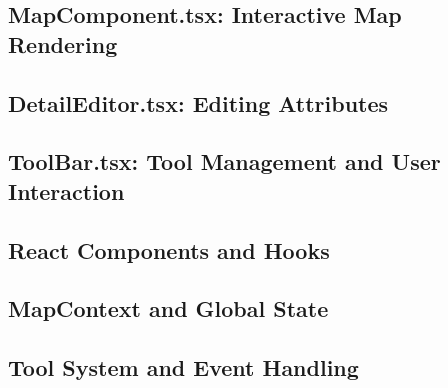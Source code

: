 \subsection{MapComponent.tsx: Interactive Map Rendering}


\subsection{DetailEditor.tsx: Editing Attributes}


\subsection{ToolBar.tsx: Tool Management and User Interaction}


\subsection{React Components and Hooks}

\subsection{MapContext and Global State}

\subsection{Tool System and Event Handling}
